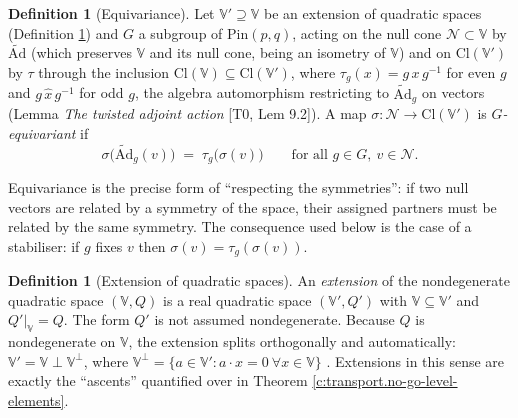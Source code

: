 \documentclass[11pt]{article}
\theoremstyle{definition}
\newtheorem{definition}[theorem]{Definition}
\theoremstyle{plain}
\newcommand{\changedmark}[2]{\marginpar{\raggedright\scriptsize\color{#1}#2}}
\providecommand{\Ad}{}\renewcommand{\Ad}{\widetilde{\mathrm{Ad}}}
\providecommand{\Cl}{}\renewcommand{\Cl}{\mathrm{Cl}}
\providecommand{\Ncone}{}\renewcommand{\Ncone}{\mathcal{N}}
\providecommand{\Pin}{}\renewcommand{\Pin}{\mathrm{Pin}}
\begin{document}
\begin{definition}[Equivariance]\label{c:obj.transport.equivariance}
\changedmark{BurntOrange}{changed since the deposit}
Let $\mathbb{V}' \supseteq \mathbb{V}$ be an extension of quadratic spaces (Definition \ref{c:obj.transport.extension-quadratic-spaces}) and $G$ a subgroup of $\Pin(p,q)$, acting on the null cone $\Ncone \subset \mathbb{V}$ by $\Ad$ (which preserves $\mathbb{V}$ and its null cone, being an isometry of $\mathbb{V}$) and on $\Cl(\mathbb{V}')$ by $\tau$ through the inclusion $\Cl(\mathbb{V}) \subseteq \Cl(\mathbb{V}')$, where $\tau_g(x) = g\,x\,g^{-1}$ for even $g$ and $g\,\hat{x}\,g^{-1}$ for odd $g$, the algebra automorphism restricting to $\Ad_g$ on vectors (Lemma \emph{The twisted adjoint action} [T0, Lem 9.2]). A map $\sigma : \Ncone \to \Cl(\mathbb{V}')$ is \emph{$G$-equivariant} if
\[
\sigma\bigl(\Ad_g(v)\bigr) \;=\; \tau_g\bigl(\sigma(v)\bigr) \qquad \text{for all } g \in G,\ v \in \Ncone .
\]
\end{definition}

\label{c:note.transport.setting-symmetry-action-equivariance-2}
Equivariance is the precise form of ``respecting the symmetries'': if two null vectors are related by a symmetry of the space, their assigned partners must be related by the same symmetry. The consequence used below is the case of a stabiliser: if $g$ fixes $v$ then $\sigma(v) = \tau_g(\sigma(v))$.

\begin{definition}[Extension of quadratic spaces]\label{c:obj.transport.extension-quadratic-spaces}
An \emph{extension} of the nondegenerate quadratic space $(\mathbb{V}, Q)$ is a real quadratic space $(\mathbb{V}', Q')$ with $\mathbb{V} \subseteq \mathbb{V}'$ and $Q'|_{\mathbb{V}} = Q$. The form $Q'$ is not assumed nondegenerate. Because $Q$ is nondegenerate on $\mathbb{V}$, the extension splits orthogonally and automatically: $\mathbb{V}' = \mathbb{V} \perp \mathbb{V}^{\perp}$, where $\mathbb{V}^{\perp} = \{ a \in \mathbb{V}' : a \cdot x = 0 \ \forall x \in \mathbb{V}\}$ \cite{Lam2005}. Extensions in this sense are exactly the ``ascents'' quantified over in Theorem \ref{c:transport.no-go-level-elements}.
\end{definition}
\end{document}

